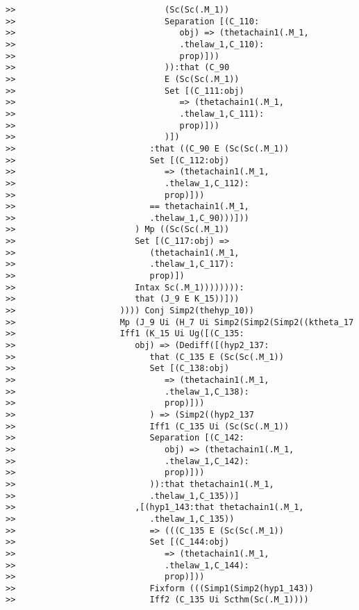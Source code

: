 \documentclass[12pt]{article}
\begin{document}
\begin{verbatim}
>>                              (Sc(Sc(.M_1))
>>                              Separation [(C_110:
>>                                 obj) => (thetachain1(.M_1,
>>                                 .thelaw_1,C_110):
>>                                 prop)]))
>>                              )):that (C_90
>>                              E (Sc(Sc(.M_1))
>>                              Set [(C_111:obj)
>>                                 => (thetachain1(.M_1,
>>                                 .thelaw_1,C_111):
>>                                 prop)]))
>>                              )])
>>                           :that ((C_90 E (Sc(Sc(.M_1))
>>                           Set [(C_112:obj)
>>                              => (thetachain1(.M_1,
>>                              .thelaw_1,C_112):
>>                              prop)]))
>>                           == thetachain1(.M_1,
>>                           .thelaw_1,C_90)))]))
>>                        ) Mp ((Sc(Sc(.M_1))
>>                        Set [(C_117:obj) =>
>>                           (thetachain1(.M_1,
>>                           .thelaw_1,C_117):
>>                           prop)])
>>                        Intax Sc(.M_1)))))))):
>>                        that (J_9 E K_15))]))
>>                     )))) Conj Simp2(thehyp_10))
>>                     Mp (J_9 Ui (H_7 Ui Simp2(Simp2(Simp2((ktheta_17
>>                     Iff1 (K_15 Ui Ug([(C_135:
>>                        obj) => (Dediff([(hyp2_137:
>>                           that (C_135 E (Sc(Sc(.M_1))
>>                           Set [(C_138:obj)
>>                              => (thetachain1(.M_1,
>>                              .thelaw_1,C_138):
>>                              prop)]))
>>                           ) => (Simp2((hyp2_137
>>                           Iff1 (C_135 Ui (Sc(Sc(.M_1))
>>                           Separation [(C_142:
>>                              obj) => (thetachain1(.M_1,
>>                              .thelaw_1,C_142):
>>                              prop)]))
>>                           )):that thetachain1(.M_1,
>>                           .thelaw_1,C_135))]
>>                        ,[(hyp1_143:that thetachain1(.M_1,
>>                           .thelaw_1,C_135))
>>                           => (((C_135 E (Sc(Sc(.M_1))
>>                           Set [(C_144:obj)
>>                              => (thetachain1(.M_1,
>>                              .thelaw_1,C_144):
>>                              prop)]))
>>                           Fixform (((Simp1(Simp2(hyp1_143))
>>                           Iff2 (C_135 Ui Scthm(Sc(.M_1))))

\end{verbatim}
\end{document}
